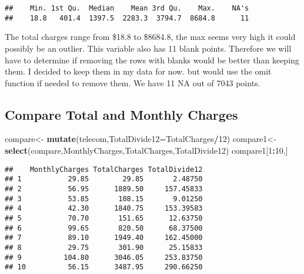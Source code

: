 \documentclass[]{article}
\newenvironment{Shaded}{\begin{snugshade}}{\end{snugshade}}
\newcommand{\KeywordTok}[1]{\textcolor[rgb]{0.13,0.29,0.53}{\textbf{#1}}}
\newcommand{\DataTypeTok}[1]{\textcolor[rgb]{0.13,0.29,0.53}{#1}}
\newcommand{\DecValTok}[1]{\textcolor[rgb]{0.00,0.00,0.81}{#1}}
\newcommand{\StringTok}[1]{\textcolor[rgb]{0.31,0.60,0.02}{#1}}
\newcommand{\OperatorTok}[1]{\textcolor[rgb]{0.81,0.36,0.00}{\textbf{#1}}}
\newcommand{\NormalTok}[1]{#1}
\begin{document}
\begin{Shaded}
\end{Shaded}

\begin{verbatim}
##    Min. 1st Qu.  Median    Mean 3rd Qu.    Max.    NA's 
##    18.8   401.4  1397.5  2283.3  3794.7  8684.8      11
\end{verbatim}

The total charges range from \$18.8 to \$8684.8, the max seems very high
it could possibly be an outlier. This variable also has 11 blank points.
Therefore we will have to determine if removing the rows with blanks
would be better than keeping them. I decided to keep them in my data for
now. but would use the omit function if needed to remove them. We have
11 NA out of 7043 points.

\subsection{Compare Total and Monthly
Charges}\label{compare-total-and-monthly-charges}

\begin{Shaded}
\begin{Highlighting}[]
\NormalTok{compare<-}\StringTok{ }\KeywordTok{mutate}\NormalTok{(telecom,}\DataTypeTok{TotalDivide12=}\NormalTok{TotalCharges}\OperatorTok{/}\DecValTok{12}\NormalTok{)}
\NormalTok{compare1<-}\KeywordTok{select}\NormalTok{(compare,MonthlyCharges,TotalCharges,TotalDivide12)}
\NormalTok{compare1[}\DecValTok{1}\OperatorTok{:}\DecValTok{10}\NormalTok{,]}
\end{Highlighting}
\end{Shaded}

\begin{verbatim}
##    MonthlyCharges TotalCharges TotalDivide12
## 1           29.85        29.85       2.48750
## 2           56.95      1889.50     157.45833
## 3           53.85       108.15       9.01250
## 4           42.30      1840.75     153.39583
## 5           70.70       151.65      12.63750
## 6           99.65       820.50      68.37500
## 7           89.10      1949.40     162.45000
## 8           29.75       301.90      25.15833
## 9          104.80      3046.05     253.83750
## 10          56.15      3487.95     290.66250
\end{verbatim}
\end{document}
